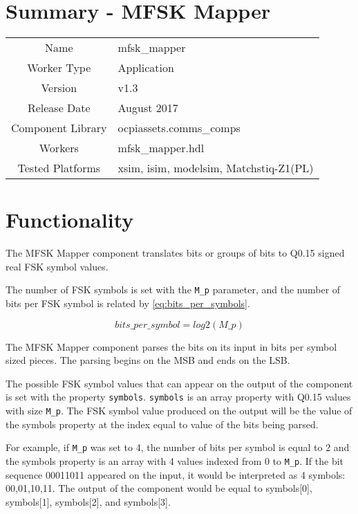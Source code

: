 \documentclass{article}
\author{} %
\date{Version \docVersion} %
\title{\docTitle}
\def\comp{mfsk\_mapper}
\def\Comp{MFSK Mapper}
\begin{document}
\section*{Summary - \Comp}
\begin{tabular}{|c|M{13.5cm}|}
	\hline
	                  &                        	\\
	\hline
	Name              & \comp                  	\\
	\hline
	Worker Type       & Application            	\\
	\hline
	Version           & v1.3                  	\\
	\hline
	Release Date      & August 2017           	\\
	\hline
	Component Library & ocpiassets.comms\_comps	\\
	\hline
	Workers           & \comp.hdl              	\\
	\hline
	Tested Platforms  & xsim, isim, modelsim, Matchstiq-Z1(PL) \\
	\hline
\end{tabular}

\section*{Functionality}
\begin{flushleft}
	The \Comp{} component translates bits or groups of bits to Q0.15 signed real FSK symbol values.\medskip
	
	The number of FSK symbols is set with the \verb+M_p+ parameter, and the number of bits per FSK symbol is related by \ref{eq:bits_per_symbols}.
	
	\begin{equation} \label{eq:bits_per_symbols}
  		bits\_per\_symbol = log2(M\_p)
	\end{equation}
	
	The \Comp{} component parses the bits on its input in bits per symbol sized pieces. The parsing begins on the MSB and ends on the LSB.\medskip
	
	The possible FSK symbol values that can appear on the output of the component is set with the property \verb+symbols+. \verb+symbols+ is an array property with Q0.15 values with size \verb+M_p+. The FSK symbol value produced on the output will be the value of the symbols property at the index equal to value of the bits being parsed.\medskip
	
	For example, if \verb+M_p+ was set to 4, the number of bits per symbol is equal to 2 and the symbols property is an array with 4 values indexed from 0 to \verb+M_p+. If the bit sequence 00011011 appeared on the input, it would be interpreted as 4 symbols: 00,01,10,11. The output of the component would be equal to symbols[0], symbols[1], symbols[2], and symbols[3].\medskip
	
\end{flushleft}
\end{document}

